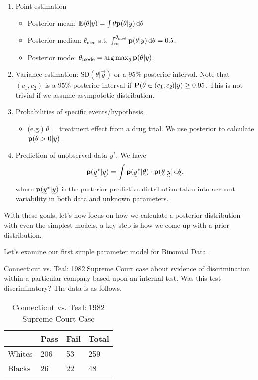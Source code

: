 \begin{enumerate}
    \item Point estimation
    \begin{itemize}
        \item Posterior mean: $\E(\theta| y) = \int \theta \p(\theta| \vec{y}) \diff \theta$
        \item Posterior median: $\theta_{\text{med}}$ s.t. $\int_{\infty}^{\theta_{\text{med}}} \p(\theta| y) \diff \theta = 0.5$.
        \item Posterior mode: $\theta_{\text{mode}} = \argmax_{\theta} \p(\theta| y)$.
    \end{itemize}
    \item Variance estimation: $\text{SD}(\theta| \vec{y})$ or a $95\%$ posterior interval. Note that $(c_1, c_2)$ is a $95\%$ posterior interval if $\P(\theta \in (c_1, c_2) | y) \ge 0.95$. This is not trivial if we assume asympototic distribution.
    \item Probabilities of specific events/hypothesis.
    \begin{itemize}
        \item (e.g.) $\theta$ = treatment effect from a drug trial. We use posterior to calculate $\p(\theta>0|y)$.
    \end{itemize}
    \item Prediction of unobserved data $y^*$. We have
    \[
        \p(\vec{y}^*| \vec{y}) = \int \p(\vec{y}^*| \vec{\theta}) \cdot \p(\vec{\theta}| \vec{y}) \diff \vec{\theta},
    \]
    where $\p(\vec{y}^*| \vec{y})$ is the posterior predictive distribution takes into account variability in both data and unknown parameters.
\end{enumerate}

With these goals, let's now focus on how we calculate a posterior distribution with even the simplest models, a key step is how we come up with a prior distribution.

Let's examine our first simple parameter model for Binomial Data.

Connecticut vs. Teal: 1982 Supreme Court case about evidence of discrimination within a particular company based upon an internal test. Was this test discriminatory? The data is as follows.

\begin{table}[ht]
\centering
\begin{tabular}{@{}llll@{}}
\toprule
       & Pass & Fail & Total \\ \midrule
Whites & 206  & 53   & 259   \\
Blacks & 26   & 22   & 48    \\ \bottomrule
\end{tabular}
\caption{Connecticut vs. Teal: 1982 Supreme Court Case}
\end{table}

